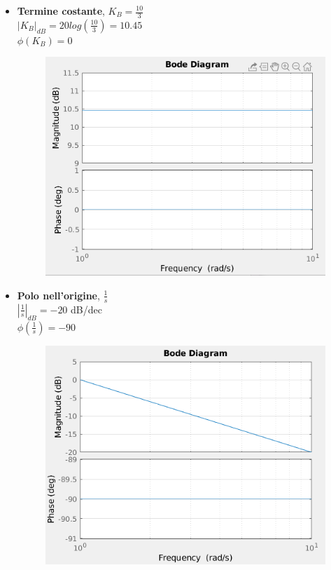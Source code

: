 \documentclass[12pt,a4paper]{article}
\begin{document}
	\begin{itemize}
		\item \textbf{Termine costante}, $K_B = \frac{10}{3}$\vspace{5px}\\
		$|K_B|_{dB} = 20log\left(\frac{10}{3}\right) = 10.45$\\
		$\phi(K_B) = 0$\degree
		\begin{figure}[h!]
			\centering
			\includegraphics[scale=0.5]{./images/bode46_1.png}
		\end{figure}
		\item \textbf{Polo nell'origine}, $\frac{1}{s}$\vspace{5px}\\$\left|\frac{1}{s}\right|_{dB} = -20$ dB/dec\\
		$\phi\left(\frac{1}{s}\right) = -90$\degree
		\begin{figure}[h!]
			\centering
			\includegraphics[scale=0.5]{./images/bode46_2.png}

\end{figure}
\end{itemize}
\end{document}
